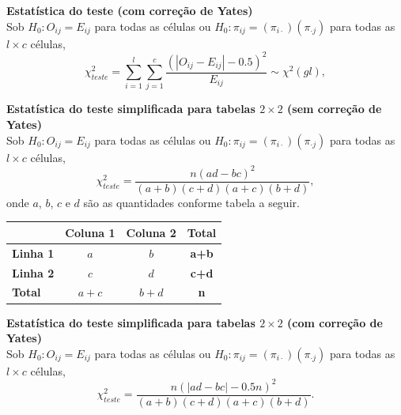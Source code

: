\documentclass[
]{book}
\theoremstyle{definition}
\theoremstyle{definition}
\theoremstyle{definition}
\theoremstyle{remark}
\begin{document}
\textbf{Estatística do teste (com correção de Yates)}\\
Sob \(H_0: O_{ij}=E_{ij}\) para todas as células ou \(H_0: \pi_{ij}=(\pi_{i\cdot})(\pi_{\cdot j})\) para todas as \(l \times c\) células,
\begin{equation}
\chi_{teste}^2 = \sum_{i=1}^{l} \sum_{j=1}^{c} \frac{(|O_{ij}-E_{ij}|-0.5)^2}{E_{ij}} \sim \chi^2(gl),
\label{eq:qui-teste-qui-bi-yates}
\end{equation}

\textbf{Estatística do teste simplificada para tabelas \(2 \times 2\) (sem correção de Yates)}\\
Sob \(H_0: O_{ij}=E_{ij}\) para todas as células ou \(H_0: \pi_{ij}=(\pi_{i\cdot})(\pi_{\cdot j})\) para todas as \(l \times c\) células,
\begin{equation}
\chi_{teste}^2 = \frac{n(ad-bc)^2}{(a+b)(c+d)(a+c)(b+d)},
\label{eq:qui-teste-qui-bi-simpl}
\end{equation}
onde \(a\), \(b\), \(c\) e \(d\) são as quantidades conforme tabela a seguir.

\begin{longtable}[]{@{}lccc@{}}
\toprule
& Coluna 1 & Coluna 2 & Total\tabularnewline
\midrule
\endhead
\textbf{Linha 1} & \(a\) & \(b\) & \textbf{a+b}\tabularnewline
\textbf{Linha 2} & \(c\) & \(d\) & \textbf{c+d}\tabularnewline
\textbf{Total} & \textbf{\(a+c\)} & \textbf{\(b+d\)} & \textbf{n}\tabularnewline
\bottomrule
\end{longtable}

\textbf{Estatística do teste simplificada para tabelas \(2 \times 2\) (com correção de Yates)}\\
Sob \(H_0: O_{ij}=E_{ij}\) para todas as células ou \(H_0: \pi_{ij}=(\pi_{i\cdot})(\pi_{\cdot j})\) para todas as \(l \times c\) células,
\begin{equation}
\chi_{teste}^2 = \frac{n(|ad-bc|-0.5n)^2}{(a+b)(c+d)(a+c)(b+d)}.
\label{eq:qui-teste-qui-bi-simpl-yates}
\end{equation}
\end{document}
